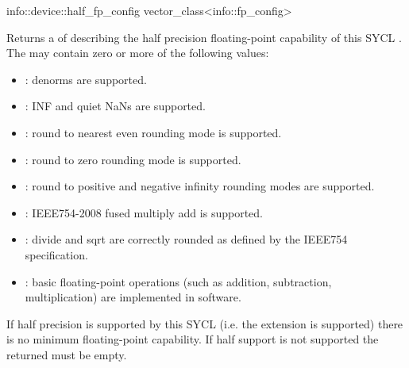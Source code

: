   \addInfoRow
  {info::device::half_fp_config}
  {vector_class<info::fp_config>}
  {
    Returns a  of  describing the half precision floating-point capability of this SYCL . The  may contain zero or more of the following values:
  \begin{itemize}
  \item {}: denorms are supported.
  \item {}: INF and quiet NaNs are
  supported.
  \item {}: round to
  nearest even rounding mode is supported.
  \item {}: round to zero
  rounding mode is supported.
  \item {}: round to positive
  and negative infinity rounding modes are supported.
  \item {}: IEEE754-2008 fused multiply add
  is supported.
  \item {}: divide and sqrt
        are correctly rounded as defined by the IEEE754 specification.
    \item {}: basic floating-point operations
        (such as addition, subtraction, multiplication) are implemented in software.
   \end{itemize}
    If half precision is supported by this SYCL  (i.e. the  extension is supported) there is no minimum floating-point capability. If half support is not supported the returned  must be empty.
  }

